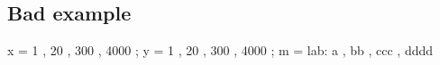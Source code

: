 \documentclass[12pt]{article}
\begin{document}


%
%
%
%
%
%
%
%


%


%


\subsection{Bad example \thesubsection}

\begin{functable}
    x = 1 , 20 , 300 , 4000 ;
    y = 1 , 20 , 300 , 4000 ;
    m = lab: a , bb , ccc , dddd 
\end{functable}
\end{document}
